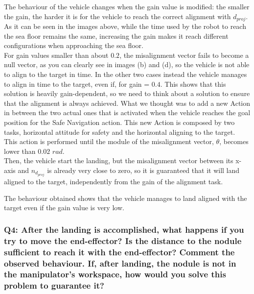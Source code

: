 \documentclass{article}
\begin{document}
The behaviour of the vehicle changes when the gain value is modified: the smaller the gain, the harder it is for the vehicle to reach the correct alignment with \(d_{proj}\). As it can be seen in the images above, while the time used by the robot to reach the sea floor remains the same, increasing the gain makes it reach different configurations when approaching the sea floor.\\
For gain values smaller than about \(0.2\), the misalignment vector fails to become a null vector, as you can clearly see in images (b) and (d), so the vehicle is not able to align to the target in time. In the other two cases instead the vehicle manages to align in time to the target, even if, for gain = \(0.4\).
This shows that this solution is heavily gain-dependent, so we need to think about a solution to ensure that the alignment is always achieved.
What we thought was to add a new Action in between the two actual ones that is activated when the vehicle reaches the goal position for the Safe Navigation action. This new Action is composed by two tasks, horizontal attitude for safety and the horizontal aligning to the target. This action is performed until the module of the misalignment vector, $\theta$, becomes lower than \(0.02 \) \({rad}\).\\
Then, the vehicle start the landing, but the misalignment vector between its x-axis and \(n_{d_{proj}}\) is already very close to zero, so it is guaranteed that it will land aligned to the target, independently from the gain of the alignment task.
\begin{figure}[H]
	\centering
	\label{im:v_land_gain0_1_ind}
\end{figure} 
The behaviour obtained shows that the vehicle manages to land aligned with the target even if the gain value is very low.
 
\subsubsection{Q4: After the landing is accomplished, what happens if you try to move the end-effector? Is the distance to the nodule sufficient to reach it with the end-effector? Comment the observed behaviour. If, after landing, the nodule is not in the manipulator's workspace, how would you solve this problem to guarantee it?}
\end{document}
